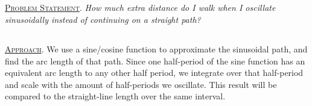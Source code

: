 \documentclass[11pt]{article}
\begin{document}
\subsection[Problem Statement]{} \textsc{\underline{Problem Statement}}. \textit{How much extra distance do I walk when I oscillate sinusoidally instead of continuing on a straight path?}

\subsection[Approach]{} \textsc{\underline{Approach}}. We use a sine/cosine function to approximate the sinusoidal path, and find the arc length of that path. Since one half-period of the sine function has an equivalent arc length to any other half period, we integrate over that half-period and scale with the amount of half-periods we oscillate. This result will be compared to the straight-line length over the same interval.
\end{document}
